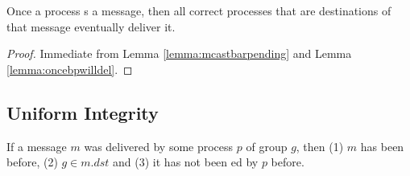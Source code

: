 \documentclass[times, 10pt]{article}
\begin{document}
\begin{props} \label{props:validity}
Once a process \amcast{}s a message, then all correct processes that are destinations of that message eventually deliver it.
\end{props}

\begin{proof}
Immediate from Lemma \ref{lemma:mcastbarpending} and Lemma \ref{lemma:oncebpwilldel}.%
\end{proof}





\subsection{Uniform Integrity}





\begin{props} \label{props:integrity}
If a message $m$ was delivered by some process $p$ of group $g$, then (1) $m$ has been \amcast{} before, (2) $g \in m.dst$ and (3) it has not been \amdel{}ed by $p$ before.
\end{props}
\end{document}
